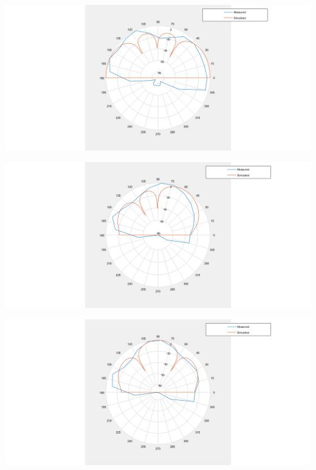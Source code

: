 \documentclass[landscape,a1paper,fontscale=0.45]{baposter} %
\begin{document}
\begin{poster}
{\begin{multicols}{2}
\end{multicols}


\begin{multicols}{2}
\vspace{1em}

\begin{center}
	\includegraphics[width=0.8\linewidth]{deg0hardware.png}
\end{center}

\begin{center}
	\includegraphics[width=0.8\linewidth]{deg60hardware.png}
\end{center}

\end{multicols}

\begin{multicols}{2}
	\vspace{1em}
	
	\begin{center}
		\includegraphics[width=0.8\linewidth]{deg90hardware.png}
	\end{center}

	
\end{multicols}
}



\end{poster}
\end{document}
